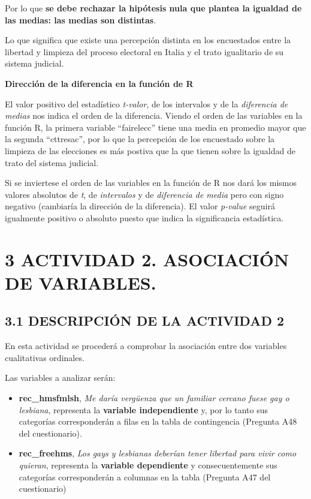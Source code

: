 \documentclass[
  12 pt,
  a4paper,
]{article}
\begin{document}
Por lo que \textbf{se debe rechazar la hipótesis nula que plantea la
igualdad de las medias: las medias son distintas}.

Lo que significa que existe una percepción distinta en los encuestados
entre la libertad y limpieza del proceso electoral en Italia y el trato
igualitario de su sistema judicial.

\textbf{Dirección de la diferencia en la función de R}

El valor positivo del estadístico \emph{t-valor}, de los intervalos y de
la \emph{diferencia de medias} nos indica el orden de la diferencia.
Viendo el orden de las variables en la función R, la primera variable
``fairelecc'' tiene una media en promedio mayor que la segunda
``cttresac'', por lo que la percepción de los encuestado sobre la
limpieza de las elecciones es más postiva que la que tienen sobre la
igualdad de trato del sistema judicial.

Si se inviertese el orden de las variables en la función de R nos dará
los mismos valores absolutos de \emph{t}, de \emph{intervalos} y de
\emph{diferencia de media} pero con signo negativo (cambiaría la
dirección de la diferencia). El valor \emph{p-value} seguirá igualmente
positivo o absoluto puesto que indica la significancia estadística.

\newpage

\section{3 ACTIVIDAD 2. ASOCIACIÓN DE
VARIABLES.}\label{actividad-2.-asociaciuxf3n-de-variables.}

\subsection{3.1 DESCRIPCIÓN DE LA ACTIVIDAD
2}\label{descripciuxf3n-de-la-actividad-2}

En esta actividad se procederá a comprobar la asociación entre dos
variables cualitativas ordinales.

Las variables a analizar serán:

\begin{itemize}
\item
  \textbf{rec\_hmsfmlsh}, \emph{Me daría vergüenza que un familiar
  cercano fuese gay o lesbiana}, representa la \textbf{variable
  independiente} y, por lo tanto sus categorías corresponderán a filas
  en la tabla de contingencia (Pregunta A48 del cuestionario).
\item
  \textbf{rec\_freehms}, \emph{Los gays y lesbianas deberían tener
  libertad para vivir como quieran}, representa la \textbf{variable
  dependiente} y consecuentemente sus categorías corresponderán a
  columnas en la tabla (Pregunta A47 del cuestionario)
\end{itemize}
\end{document}
